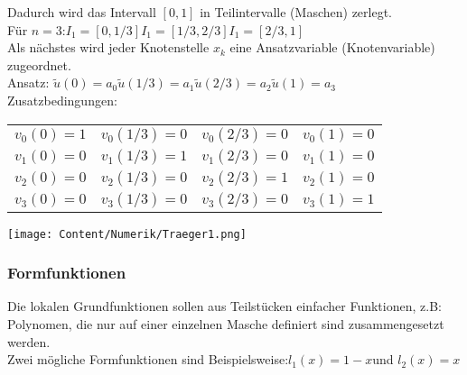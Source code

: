 \begin{minipage}{11cm}
	Dadurch wird das Intervall $[0,1]$ in Teilintervalle (Maschen) zerlegt.\\

	Für $n=3$:\quad $I_1=[0,1/3]$\quad $I_1=[1/3,2/3]$\quad $I_1=[2/3,1]$\\

	Als nächstes wird jeder Knotenstelle $x_k$ eine Ansatzvariable (Knotenvariable) zugeordnet.\\

	Ansatz: \quad $\tilde{u}(0)=a_0$\quad $\tilde{u}(1/3)=a_1$\quad $\tilde{u}(2/3)=a_2$\quad $\tilde{u}(1)=a_3$\\

	Zusatzbedingungen:
	\begin{tabular}{llll}
		$v_0(0)=1$ & $v_0(1/3)=0$ & $v_0(2/3)=0$ & $v_0(1)=0$ \\
		$v_1(0)=0$ & $v_1(1/3)=1$ & $v_1(2/3)=0$ & $v_1(1)=0$ \\
		$v_2(0)=0$ & $v_2(1/3)=0$ & $v_2(2/3)=1$ & $v_2(1)=0$ \\
		$v_3(0)=0$ & $v_3(1/3)=0$ & $v_3(2/3)=0$ & $v_3(1)=1$ \\
	\end{tabular}
\end{minipage}
\hfill
\begin{minipage}{8cm}
	\texttt{[image: Content/Numerik/Traeger1.png]}
\end{minipage}


\subsubsection{Formfunktionen}
Die lokalen Grundfunktionen sollen aus Teilstücken einfacher Funktionen, z.B: Polynomen, die nur auf einer einzelnen Masche definiert sind zusammengesetzt werden.\\
Zwei mögliche Formfunktionen sind Beispielsweise:\quad $l_1(x)=1-x$\quad und \quad $l_2(x)=x$\\


